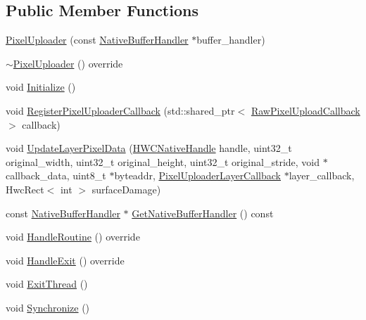 \subsection*{Public Member Functions}
\begin{DoxyCompactItemize}
\item 
\mbox{\hyperlink{classhwcomposer_1_1PixelUploader_ae452a5d38f705baa48d6c9e78d35878b}{Pixel\+Uploader}} (const \mbox{\hyperlink{classhwcomposer_1_1NativeBufferHandler}{Native\+Buffer\+Handler}} $\ast$buffer\+\_\+handler)
\item 
\mbox{\hyperlink{classhwcomposer_1_1PixelUploader_a0b395681de457f6caa641e4cea6513f6}{$\sim$\+Pixel\+Uploader}} () override
\item 
void \mbox{\hyperlink{classhwcomposer_1_1PixelUploader_a6d835746b222526f59cb5df426d7885d}{Initialize}} ()
\item 
void \mbox{\hyperlink{classhwcomposer_1_1PixelUploader_a8318f648f5452cffdb1dd2c54f452ef2}{Register\+Pixel\+Uploader\+Callback}} (std\+::shared\+\_\+ptr$<$ \mbox{\hyperlink{classhwcomposer_1_1RawPixelUploadCallback}{Raw\+Pixel\+Upload\+Callback}} $>$ callback)
\item 
void \mbox{\hyperlink{classhwcomposer_1_1PixelUploader_ae2154e6039f703b8ce95ac3ffe8e8c8b}{Update\+Layer\+Pixel\+Data}} (\mbox{\hyperlink{alios_2platformdefines_8h_ac0a2eaf260f556d17fe489911f017bdf}{H\+W\+C\+Native\+Handle}} handle, uint32\+\_\+t original\+\_\+width, uint32\+\_\+t original\+\_\+height, uint32\+\_\+t original\+\_\+stride, void $\ast$callback\+\_\+data, uint8\+\_\+t $\ast$byteaddr, \mbox{\hyperlink{classhwcomposer_1_1PixelUploaderLayerCallback}{Pixel\+Uploader\+Layer\+Callback}} $\ast$layer\+\_\+callback, Hwc\+Rect$<$ int $>$ surface\+Damage)
\item 
const \mbox{\hyperlink{classhwcomposer_1_1NativeBufferHandler}{Native\+Buffer\+Handler}} $\ast$ \mbox{\hyperlink{classhwcomposer_1_1PixelUploader_a5fbbbd29b8712fe6fa6278e9422dd1e9}{Get\+Native\+Buffer\+Handler}} () const
\item 
void \mbox{\hyperlink{classhwcomposer_1_1PixelUploader_a73abd205b50c5cdcc693886536553889}{Handle\+Routine}} () override
\item 
void \mbox{\hyperlink{classhwcomposer_1_1PixelUploader_ae6bfd528de70bc53d8eb30eb76b8d8fd}{Handle\+Exit}} () override
\item 
void \mbox{\hyperlink{classhwcomposer_1_1PixelUploader_a445ba292fde6978ce93994706574e6ed}{Exit\+Thread}} ()
\item 
void \mbox{\hyperlink{classhwcomposer_1_1PixelUploader_a1ae866ac73ce4866d88479cebeb16e41}{Synchronize}} ()
\end{DoxyCompactItemize}

